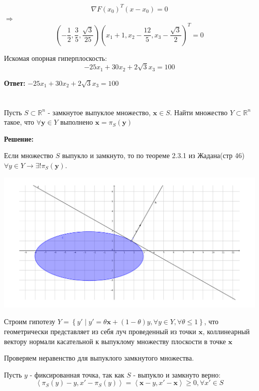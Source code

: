 \documentclass[a4paper,12pt]{article}
\newcommand{\lt}{\left}
\newcommand{\rt}{\right}
\begin{document}
$$ \nabla F(x_0)^T(x-x_0) = 0$$
$\Longrightarrow$ $$\lt(-\frac{1}{2}, \frac{3}{5},\frac{\sqrt{3}}{25}\rt)\lt(x_1+1, x_2-\frac{12}{5}, x_3-\frac{\sqrt{3}}{2}\rt)^T = 0$$

Искомая опорная гиперплоскость:
$$-25x_1 + 30x_2+2\sqrt{3}x_3 = 100$$


\textbf{Ответ:} $-25x_1 + 30x_2+2\sqrt{3}x_3 = 100$

\section{}

Пусть $S \subset \mathbb{R}^n$ - замкнутое выпуклое множество, $\mathbf{x} \in S$. Найти множество $Y \subset \mathbb{R}^n$ такое, что $\forall \mathbf{y} \in Y$ выполнено $\mathbf{x} = \pi_S(\mathbf{y})$

\vspace{\baselineskip}

\textbf{Решение:}

\vspace{\baselineskip}

Если множество $S$ выпукло и замкнуто, то по теореме 2.3.1 из Жадана(стр 46) $\forall y\in Y \rightarrow \exists! \pi_S(\mathbf{y})$. 

\includegraphics[width=\textwidth]{image2.pdf}

Строим гипотезу $Y = \lt\{y' \mid y' = \theta \mathbf{x} + (1-\theta)y, \forall y \in Y, \forall \theta \leq 1  \rt\}$, что геометрически представляет из себя луч проведенный из точки $\mathbf{x}$, коллинеарный вектору нормали касательной к выпуклому множеству плоскости в точке $\mathbf{x}$

Проверяем неравенство для выпуклого замкнутого множества.

Пусть $y$ - фиксированная точка, так как $S$ - выпукло и замкнуто верно:
$$ \lt\langle{\pi_S(y) - y, x' - \pi_S(y)}\rt\rangle = \lt\langle{\mathbf{x} - y, x' - \mathbf{x}}\rt\rangle \ge 0,  \forall x' \in S$$
\end{document}
